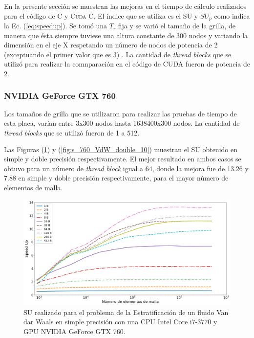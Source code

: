 En la presente sección se muestran las mejoras en el tiempo de cálculo realizados para el código de \textsc{C} y \textsc{Cuda C}. El índice que se utiliza es el SU y $SU_p$ como indica la Ec. (\ref{eq:speedup}). Se tomó una $T_r$ fija y se varió el tamaño de la grilla, de manera que ésta siempre tuviese una altura constante de 300 nodos y variando la dimensión en el eje \textsc{X} respetando un número de nodos de potencia de 2 (exceptuando el primer valor que es 3) . La cantidad de \textit{thread blocks} que se utilizó para realizar la comnparación en el código de \textsc{CUDA} fueron de potencia de 2.

\subsubsection{NVIDIA GeForce GTX 760}

Los tamaños de grilla que se utilizaron para realizar las pruebas de tiempo de esta placa, varían entre 3x300 nodos hasta 1638400x300 nodos. La cantidad de \textit{thread blocks} que se utilizó fueron de 1 a 512.

Las Figuras (\ref{fig:s_760_VdW_simple_10}) y (\ref{fig:s_760_VdW_double_10}) muestran el SU obtenido en simple y doble precisión respectivamente. El mejor resultado en ambos casos se obtuvo para un número de \textit{thread block} igual a 64, donde la mejora fue de 13.26 y 7.88 en simple y doble precisión respectivamente, para el mayor número de elementos de malla.



\begin{figure}[htbp]
	\centering
	\includegraphics[width=\textwidth]{figs/cap4/s_760_VdW_simple_10}
	\caption{SU realizado para el problema de la Estratificación de un fluido Van dar Waals en simple precisión con una CPU Intel Core i7-3770 y GPU NVIDIA GeForce GTX 760.} 
	\label{fig:s_760_VdW_simple_10}	
\end{figure}

